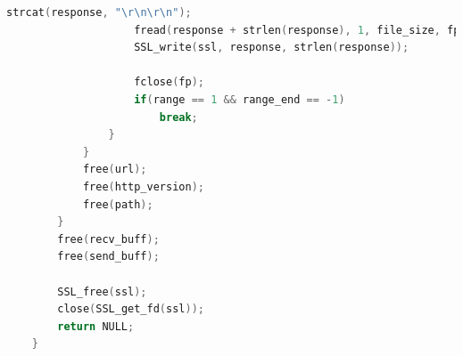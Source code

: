\documentclass[UTF8]{article}
\begin{document}
\begin{lstlisting}[language=c]
                    strcat(response, "\r\n\r\n");
                    fread(response + strlen(response), 1, file_size, fp);
                    SSL_write(ssl, response, strlen(response));
    
                    fclose(fp);
                    if(range == 1 && range_end == -1)
                        break;
                }
            }
            free(url);
            free(http_version);
            free(path);
        }
        free(recv_buff);
        free(send_buff);
    
        SSL_free(ssl);
        close(SSL_get_fd(ssl));
        return NULL;
    }
\end{lstlisting}
\end{document}
